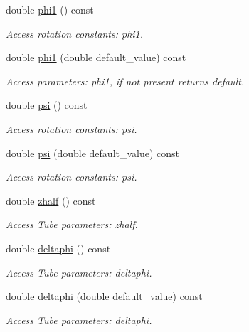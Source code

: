 \begin{DoxyCompactItemize}
double \hyperlink{struct_d_d4hep_1_1_x_m_l_1_1_dimension_a4a79ef6ca40a9cfd8f04e26d79e9a572}{phi1} () const
\begin{DoxyCompactList}\small\item\em Access rotation constants\+: phi1. \end{DoxyCompactList}\item 
double \hyperlink{struct_d_d4hep_1_1_x_m_l_1_1_dimension_a7abed4e7679ef88dfec6259a9ba779c8}{phi1} (double default\+\_\+value) const
\begin{DoxyCompactList}\small\item\em Access parameters\+: phi1, if not present returns default. \end{DoxyCompactList}\item 
double \hyperlink{struct_d_d4hep_1_1_x_m_l_1_1_dimension_ab313a407cd67f48127b61e04d4583beb}{psi} () const
\begin{DoxyCompactList}\small\item\em Access rotation constants\+: psi. \end{DoxyCompactList}\item 
double \hyperlink{struct_d_d4hep_1_1_x_m_l_1_1_dimension_aeb3cd784b05d3e447bbeba176cf967a7}{psi} (double default\+\_\+value) const
\begin{DoxyCompactList}\small\item\em Access rotation constants\+: psi. \end{DoxyCompactList}\item 
double \hyperlink{struct_d_d4hep_1_1_x_m_l_1_1_dimension_a701f5ce5b766ba12d0a7db3bc0333cd1}{zhalf} () const
\begin{DoxyCompactList}\small\item\em Access Tube parameters\+: zhalf. \end{DoxyCompactList}\item 
double \hyperlink{struct_d_d4hep_1_1_x_m_l_1_1_dimension_af6a421e1f291a1190db13fb71556c588}{deltaphi} () const
\begin{DoxyCompactList}\small\item\em Access Tube parameters\+: deltaphi. \end{DoxyCompactList}\item 
double \hyperlink{struct_d_d4hep_1_1_x_m_l_1_1_dimension_af75d02b3737e0fb60610add557a819c9}{deltaphi} (double default\+\_\+value) const
\begin{DoxyCompactList}\small\item\em Access Tube parameters\+: deltaphi. \end{DoxyCompactList}\item 

\end{DoxyCompactItemize}
